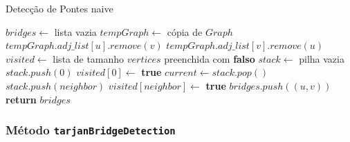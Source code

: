 \documentclass[12pt]{article}
\begin{document}
\begin{algorithm}[H]
\caption{Detecção de Pontes naive}
\begin{algorithmic}[1]
    \State $bridges \gets$ lista vazia
            \State $tempGraph \gets$ cópia de $Graph$
            \State $tempGraph.adj\_list[u].remove(v)$ 
            \State $tempGraph.adj\_list[v].remove(u)$
            \State $visited \gets$ lista de tamanho $vertices$ preenchida com \textbf{falso}
            \State $stack \gets$ pilha vazia
            \State $stack.push(0)$
            \State $visited[0] \gets$ \textbf{true}
                \State $current \gets stack.pop()$
                        \State $stack.push(neighbor)$
                        \State $visited[neighbor] \gets$ \textbf{true}
                    \EndIf
                \EndFor
            \EndWhile
                \State $bridges.push((u, v))$ 
            \EndIf
        \EndFor
    \EndFor
    \State \textbf{return} $bridges$
\EndFunction
\end{algorithmic}
\end{algorithm}

\subsubsection{Método \texttt{tarjanBridgeDetection}}
\end{document}
